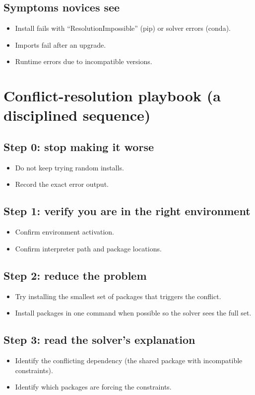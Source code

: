 \subsection{Symptoms novices see}
\begin{itemize}
\item Install fails with ``ResolutionImpossible'' (pip) or solver errors (conda).
\item Imports fail after an upgrade.
\item Runtime errors due to incompatible versions.
\end{itemize}

\section{Conflict-resolution playbook (a disciplined sequence)}
\subsection{Step 0: stop making it worse}
\begin{itemize}
\item Do not keep trying random installs.
\item Record the exact error output.
\end{itemize}

\subsection{Step 1: verify you are in the right environment}
\begin{itemize}
\item Confirm environment activation.
\item Confirm interpreter path and package locations.
\end{itemize}

\subsection{Step 2: reduce the problem}
\begin{itemize}
\item Try installing the smallest set of packages that triggers the conflict.
\item Install packages in one command when possible so the solver sees the full set.
\end{itemize}

\subsection{Step 3: read the solver's explanation}
\begin{itemize}
\item Identify the conflicting dependency (the shared package with incompatible constraints).
\item Identify which packages are forcing the constraints.
\end{itemize}

